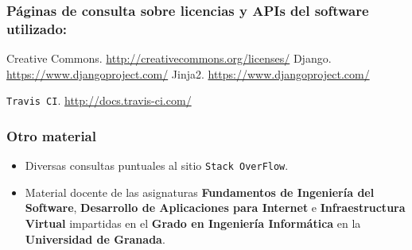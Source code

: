 \subsubsection*{Páginas de consulta sobre licencias y APIs del software utilizado:}
 Creative Commons. \url{http://creativecommons.org/licenses/}
 Django. \url{https://www.djangoproject.com/}
 Jinja2. \url{https://www.djangoproject.com/}

 {\tt Travis CI}. \url{http://docs.travis-ci.com/}

\bigskip


\subsubsection*{Otro material}
\begin{itemize}
	\item Diversas consultas puntuales al sitio {\tt Stack OverFlow}.
	\item Material docente de las asignaturas \textbf{Fundamentos de Ingeniería del Software}, \textbf{Desarrollo de Aplicaciones para Internet} e \textbf{Infraestructura Virtual} impartidas en el \textbf{Grado en Ingeniería Informática} en la \textbf{Universidad de Granada}.
\end{itemize}
